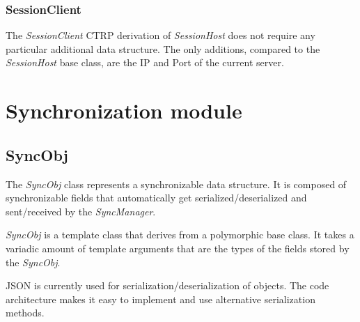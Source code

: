 \documentclass{report}
\begin{document}
            \subsection{SessionClient}

                The \emph{SessionClient} CTRP derivation of \emph{SessionHost} does not require any particular additional data structure. The only additions, compared to the \emph{SessionHost} base class, are the IP and Port of the current server.

    \newpage

    \chapter{Synchronization module}

        \section{SyncObj}
            The \emph{SyncObj} class represents a synchronizable data structure. 
            It is composed of synchronizable fields that automatically get serialized/deserialized and sent/received by the \emph{SyncManager}.

            \emph{SyncObj} is a template class that derives from a polymorphic base class. 
            It takes a variadic amount of template arguments that are the types of the fields stored by the \emph{SyncObj}.

            JSON is currently used for serialization/deserialization of objects. 
            The code architecture makes it easy to implement and use alternative serialization methods.
\end{document}
